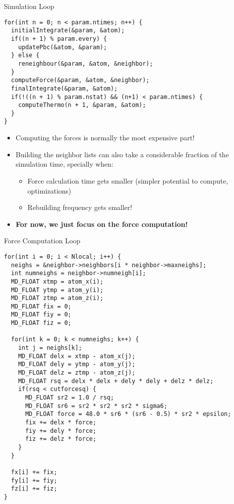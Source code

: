 \documentclass[aspectratio=43,t]{beamer}
\begin{document}
  \begin{frame}[fragile]{Simulation Loop}
    \begin{lstlisting}
for(int n = 0; n < param.ntimes; n++) {
  initialIntegrate(&param, &atom);
  if((n + 1) % param.every) {
    updatePbc(&atom, &param);
  } else {
    reneighbour(&param, &atom, &neighbor);
  }
  computeForce(&param, &atom, &neighbor);
  finalIntegrate(&param, &atom);
  if(!((n + 1) % param.nstat) && (n+1) < param.ntimes) {
    computeThermo(n + 1, &param, &atom);
  }
}
    \end{lstlisting}
    \begin{itemize}
      \item Computing the forces is normally the most expensive part!
      \item Building the neighbor lists can also take a considerable fraction of the simulation time, specially when:
      \begin{itemize}
        \item Force calculation time gets smaller (simpler potential to compute, optimizations)
        \item Rebuilding frequency gets smaller!
      \end{itemize}
      \item \textbf{For now, we just focus on the force computation!}
    \end{itemize}
  \end{frame}

  \begin{frame}[fragile]{Force Computation Loop}
    \begin{lstlisting}[basicstyle=\tt\tiny]
for(int i = 0; i < Nlocal; i++) {
  neighs = &neighbor->neighbors[i * neighbor->maxneighs];
  int numneighs = neighbor->numneigh[i];
  MD_FLOAT xtmp = atom_x(i);
  MD_FLOAT ytmp = atom_y(i);
  MD_FLOAT ztmp = atom_z(i);
  MD_FLOAT fix = 0;
  MD_FLOAT fiy = 0;
  MD_FLOAT fiz = 0;

  for(int k = 0; k < numneighs; k++) {
    int j = neighs[k];
    MD_FLOAT delx = xtmp - atom_x(j);
    MD_FLOAT dely = ytmp - atom_y(j);
    MD_FLOAT delz = ztmp - atom_z(j);
    MD_FLOAT rsq = delx * delx + dely * dely + delz * delz;
    if(rsq < cutforcesq) {
      MD_FLOAT sr2 = 1.0 / rsq;
      MD_FLOAT sr6 = sr2 * sr2 * sr2 * sigma6;
      MD_FLOAT force = 48.0 * sr6 * (sr6 - 0.5) * sr2 * epsilon;
      fix += delx * force;
      fiy += dely * force;
      fiz += delz * force;
    }
  }

  fx[i] += fix;
  fy[i] += fiy;
  fz[i] += fiz;
}
    \end{lstlisting}
  \end{frame}
\end{document}
